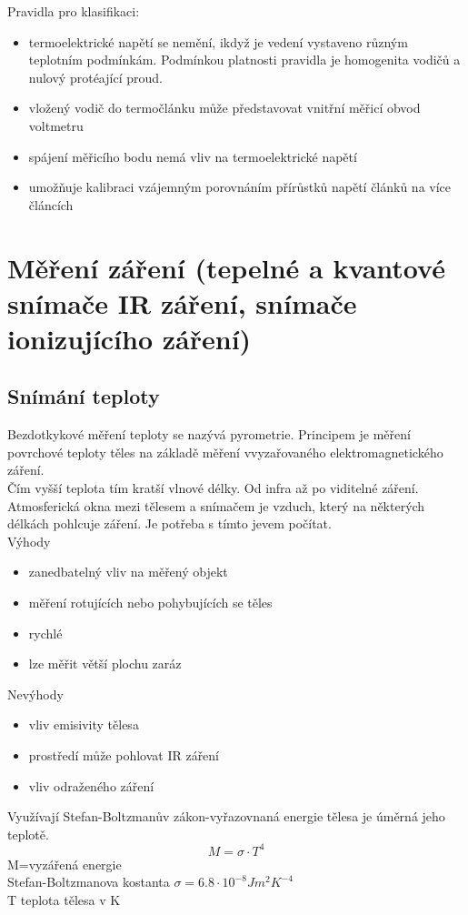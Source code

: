 Pravidla pro klasifikaci:
\begin{itemize}
    \item termoelektrické napětí se nemění, ikdyž je vedení vystaveno různým teplotním podmínkám. Podmínkou platnosti pravidla je homogenita vodičů a nulový protéající proud.
    \item vložený vodič do termočlánku může představovat vnitřní měřicí obvod voltmetru
    \item spájení měřicího bodu nemá vliv na termoelektrické napětí
    \item umožňuje kalibraci vzájemným porovnáním přírůstků napětí článků na více článcích
\end{itemize}

\section{Měření záření (tepelné a kvantové snímače IR záření, snímače ionizujícího záření)}

\subsection*{Snímání teploty}
Bezdotkykové měření teploty se nazývá pyrometrie. Principem je měření povrchové teploty těles na základě měření vvyzařovaného elektromagnetického záření.\\
Čím vyšší teplota tím kratší vlnové délky. Od infra až po viditelné záření.\\
Atmosferická okna mezi tělesem a snímačem je vzduch, který na některých délkách pohlcuje záření. Je potřeba s tímto jevem počítat.\\
Výhody
\begin{itemize}
    \item zanedbatelný vliv na měřený objekt
    \item  měření rotujících nebo pohybujících se těles
    \item rychlé
    \item lze měřit větší plochu zaráz
\end{itemize}
Nevýhody
\begin{itemize}
    \item vliv emisivity tělesa
    \item prostředí může pohlovat IR záření
    \item vliv odraženého záření
\end{itemize}

Využívají Stefan-Boltzmanův zákon-vyřazovnaná energie tělesa je úměrná jeho teplotě.
\begin{equation}
    M=\sigma \cdot T^4
\end{equation}
M=vyzářená energie\\
Stefan-Boltzmanova kostanta \(\sigma = 6.8\cdot10^{-8}Jm^2K^{-4}\)\\
T teplota tělesa v K\\

